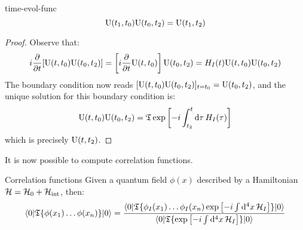 \begin{lemma}[before upper = {\tcbtitle}]{}{time-evol-func}
  \begin{equation}
    \mathrm{U}(t_1,t_0) \mathrm{U}(t_0,t_2) = \mathrm{U}(t_1,t_2)
  \end{equation}
\end{lemma}

\begin{proofbox}
  \begin{proof}
    Observe that:
    \begin{equation*}
      i \frac{\partial}{\partial t} [\mathrm{U}(t,t_0) \mathrm{U}(t_0,t_2)] = \left[ i \frac{\partial}{\partial t} \mathrm{U}(t,t_0) \right] \mathrm{U}(t_0,t_2) = H_I(t) \mathrm{U}(t,t_0) \mathrm{U}(t_0,t_2)
    \end{equation*}
    The boundary condition now reads $ [\mathrm{U}(t,t_0) \mathrm{U}(t_0,t_2)]_{t = t_0} = \mathrm{U}(t_0,t_2) $, and the unique solution for this boundary condition is:
    \begin{equation*}
      \mathrm{U}(t,t_0) \mathrm{U}(t_0,t_2) = \mathfrak{T} \exp \left[ -i \int_{t_2}^t \mathrm{d}\tau\, H_I(\tau) \right]
    \end{equation*}
    which is precisely $ \mathrm{U}(t,t_2) $.
  \end{proof}
\end{proofbox}

It is now possible to compute correlation functions.

\begin{theorem}{Correlation functions}{}
  Given a quantum field $ \phi(x) $ described by a Hamiltonian $ \mathcal{H} = \mathcal{H}_0 + \mathcal{H}_\text{int} $, then:
  \begin{equation}
    \braket{0 | \mathfrak{T}\{\phi(x_1) \dots \phi(x_n)\} | 0} = \frac{\braket{0 | \mathfrak{T}\{\phi_I(x_1) \dots \phi_I(x_n) \exp \left[ -i \int \mathrm{d}^4x\, \mathcal{H}_I \right]\} | 0}}{\braket{0 | \mathfrak{T}\{\exp \left[ -i \int \mathrm{d}^4x\, \mathcal{H}_I \right]\} |0}}
    \label{eq:corr-func-pert}
  \end{equation}
\end{theorem}

